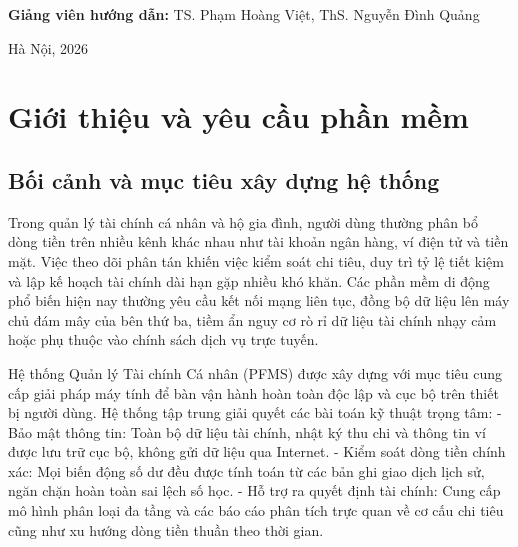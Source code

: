 \documentclass[a4paper,12pt]{report}
\begin{document}
\begin{titlepage}
\begin{center}
\vspace{0.8cm}

{\large\textbf{Giảng viên hướng dẫn:} TS. Phạm Hoàng Việt, ThS. Nguyễn Đình Quảng}

\vfill

{\large Hà Nội, 2026}

\end{center}
\end{titlepage}

\newpage
\tableofcontents
\newpage
\listoffigures
\newpage
\listoftables

\newpage

\chapter{Giới thiệu và yêu cầu phần
mềm}\label{giux1edbi-thiux1ec7u-vuxe0-yuxeau-cux1ea7u-phux1ea7n-mux1ec1m}

\section{Bối cảnh và mục tiêu xây dựng hệ
thống}\label{bux1ed1i-cux1ea3nh-vuxe0-mux1ee5c-tiuxeau-xuxe2y-dux1ef1ng-hux1ec7-thux1ed1ng}

Trong quản lý tài chính cá nhân và hộ gia đình, người dùng thường phân
bổ dòng tiền trên nhiều kênh khác nhau như tài khoản ngân hàng, ví điện
tử và tiền mặt. Việc theo dõi phân tán khiến việc kiểm soát chi tiêu,
duy trì tỷ lệ tiết kiệm và lập kế hoạch tài chính dài hạn gặp nhiều khó
khăn. Các phần mềm di động phổ biến hiện nay thường yêu cầu kết nối mạng
liên tục, đồng bộ dữ liệu lên máy chủ đám mây của bên thứ ba, tiềm ẩn
nguy cơ rò rỉ dữ liệu tài chính nhạy cảm hoặc phụ thuộc vào chính sách
dịch vụ trực tuyến.

Hệ thống Quản lý Tài chính Cá nhân (PFMS) được xây dựng với mục tiêu
cung cấp giải pháp máy tính để bàn vận hành hoàn toàn độc lập và cục bộ
trên thiết bị người dùng. Hệ thống tập trung giải quyết các bài toán kỹ
thuật trọng tâm: - Bảo mật thông tin: Toàn bộ dữ liệu tài chính, nhật ký
thu chi và thông tin ví được lưu trữ cục bộ, không gửi dữ liệu qua
Internet. - Kiểm soát dòng tiền chính xác: Mọi biến động số dư đều được
tính toán từ các bản ghi giao dịch lịch sử, ngăn chặn hoàn toàn sai lệch
số học. - Hỗ trợ ra quyết định tài chính: Cung cấp mô hình phân loại đa
tầng và các báo cáo phân tích trực quan về cơ cấu chi tiêu cũng như xu
hướng dòng tiền thuần theo thời gian.
\end{document}
